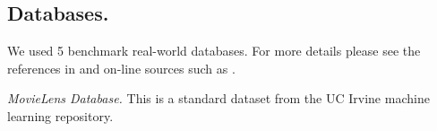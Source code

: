 \documentclass[twoside,leqno,twocolumn]{article}
\begin{document}
\subsection{Databases.}

We used %
5 benchmark real-world databases.   
For more details please see the references in \cite{Schulte2012} and on-line sources such as \cite{bib:jbnsite}.



{\em MovieLens Database.} This is a standard dataset from the UC Irvine machine learning repository. 
%
\end{document}

